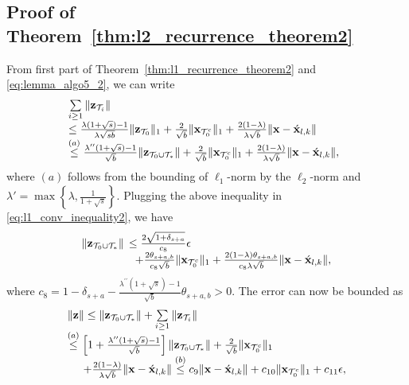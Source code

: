\documentclass[journal]{IEEEtran}
\newcommand{\mbx}{\mathbf{x}}
\newcommand{\mbz}{\mathbf{z}}
\newcommand{\T}{\mathcal{T}}
\begin{document}
\subsection{Proof of Theorem~\ref{thm:l2_recurrence_theorem2}}
From first part of Theorem~\ref{thm:l1_recurrence_theorem2} and \eqref{eq:lemma_algo5_2}, we can write
\begin{eqnarray}
\label{eq:l2_recurrence_inequality1}
\begin{array}{l}
\hspace{-2mm}\sum\limits_{i \geq 1} \|\mbz_{\T_i}\| \\ \hspace{-2mm} \leq \frac{ \lambda(1+\sqrt{s}) -1}{\lambda\sqrt{sb}}\|\mbz_{\T_0}\|_1 + \frac{2}{\sqrt{b}}\|\mbx_{\T_0^c}\|_1 + \frac{2(1-\lambda)}{\lambda \sqrt{b}}\|\mbx  - \acute{\mbx}_{l,k}\| \\
\hspace{-2mm} \stackrel{(a)}{\leq} \frac{\lambda^{\prime \prime}(1+\sqrt{s}) -1}{\sqrt{b}}\|\mbz_{\T_0 \cup \T_*}\| + \frac{2}{\sqrt{b}}\|\mbx_{\T_0^c}\|_1 + \frac{2(1-\lambda)}{\lambda\sqrt{b}}\|\mbx  - \acute{\mbx}_{l,k}\|,
\end{array}
\end{eqnarray}
where $(a)$ follows from the bounding of $\ell_1$-norm by the $\ell_2$-norm and $\lambda' = \max\left\{\lambda,\frac{1}{1+\sqrt{s}}\right\}$. Plugging the above inequality in  \eqref{eq:l1_conv_inequality2}, we have
\begin{eqnarray}
\label{eq:l2_recurrence_inequality2}
\begin{array}{rl}
\|\mbz_{\T_0 \cup \T_*}\| & \hspace{-2mm}\leq \frac{2\sqrt{1+\delta_{s+a}}}{c_8} \epsilon \\
& + \frac{2\theta_{s+a,b}}{c_8 \sqrt{b}} \|\mbx_{\T_0^c}\|_1 + \frac{2(1-\lambda)\theta_{s+a,b}}{c_8 \lambda \sqrt{b}}\|\mbx  - \acute{\mbx}_{l,k}\|,
\end{array}
\end{eqnarray}
where $c_8 = 1-\delta_{s+a}-\frac{\lambda^{\prime \prime}(1+\sqrt{s})-1}{\sqrt{b}}\theta_{s+a,b} > 0$. The error can now be bounded as
\begin{eqnarray*}
\begin{array}{l}
\|\mbz\|  \leq \|\mbz_{\T_0 \cup \T_*}\| + \sum\limits_{i \geq 1} \|\mbz_{\T_i}\| \\
 \stackrel{(a)}{\leq} \left[1+\frac{\lambda^{\prime \prime}(1+\sqrt{s})-1}{\sqrt{b}}\right]\|\mbz_{\T_0 \cup \T_*}\| + \frac{2}{\sqrt{b}}\|\mbx_{\T_0^c}\|_1\\
  \hspace{5mm} + \frac{2(1-\lambda)}{\lambda \sqrt{b}}\|\mbx  - \acute{\mbx}_{l,k}\| 
 \stackrel{(b)}{\leq} c_9 \|\mbx  - \acute{\mbx}_{l,k}\| + c_{10} \|\mbx_{\T_0^c}\|_1 + c_{11} \epsilon,
\end{array}
\end{eqnarray*}
\end{document}
